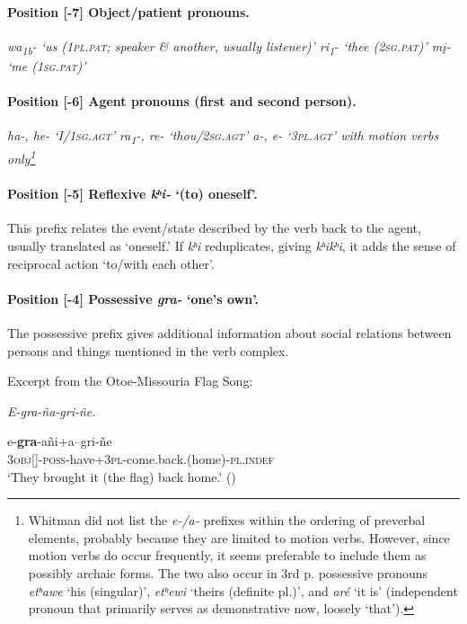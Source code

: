 \documentclass[output=paper]{LSP/langsci}
\begin{document}
\noindent
\paragraph*{Position [-7]  Object/patient pronouns.}

\ea
\ea  \itshape  wa\textsubscript{1b}-     {\upshape `us (\textsc{1pl.pat}; speaker \& another, usually listener)' 	}
\ex  \itshape  ri\textsubscript{1}-        {\upshape `thee (\textsc{2sg.pat})'				}
\ex  \itshape  m\k{i}-       {\upshape `me (\textsc{1sg.pat})'                         }
\z
\z

\paragraph*{Position [-6]  Agent pronouns (first and second person).} 	

\ea
\ea  \itshape  ha-, he-   {\upshape `I/\textsc{1sg.agt}'										}
\ex  \itshape  ra\textsubscript{1}-, re-    {\upshape `thou/\textsc{2sg.agt}'				          	    			}
\ex  \itshape  a-, e- `\textsc{3pl.agt}'  with motion verbs only\footnote{Whitman did not list the \textit{e-/a-} prefixes within the ordering of preverbal elements, probably because they are limited to motion verbs. However, since motion verbs do occur frequently, it seems preferable to include them as possibly archaic forms. The two also occur in 3rd p. possessive pronouns \textit{etʰawe} `his (singular)', \textit{etʰewi} `theirs (definite pl.)', and \textit{aré} `it is' (independent pronoun that primarily serves as demonstrative now, loosely  {\upshape `that').}}
\z
\z

\noindent
\paragraph*{Position [-5]  Reflexive \textit{kʰi-}  `(to) oneself'.}		
					     		  
This prefix relates the event/state described by the verb back to the agent, usually translated as `oneself.' If \textit{kʰi} reduplicates, giving \textit{kʰikʰi}, it adds the sense of reciprocal action `to/with each other'.  

\noindent
\paragraph*{Position [-4] Possessive  \textit{gra-}  `one's own'.}	
						      
The possessive prefix gives additional information about social relations between persons and things mentioned in the verb complex.				
\begin{exe}
\ex	Excerpt from the Otoe-Missouria Flag Song:  	
						           
\textit{E-gra-ña-gri-ñe}.

\gll e-\textbf{gra}-añi+a--gri-ñe \\		     
3\textsc{obj}[]-\textsc{poss}-have+3\textsc{pl}-come.back.(home)-\textsc{pl.indef} \\
\trans `They brought it (the flag) back home.' (\citealt{Greer2008})	 
\end{exe}
\end{document}
